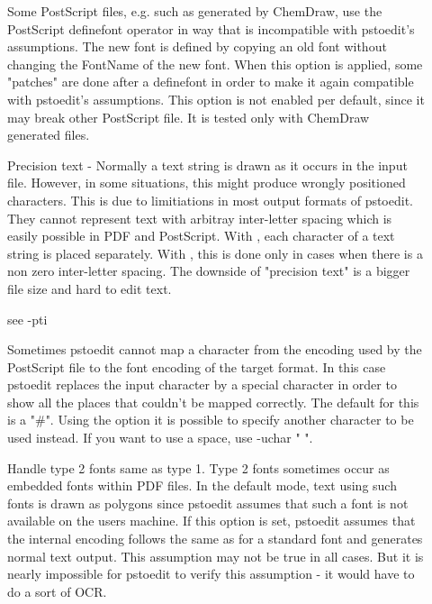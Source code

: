 \documentclass[english,a4paper]{article}
\begin{document}
\begin{description}
\item[] 
Some PostScript files, e.g. such as generated by ChemDraw, use the PostScript definefont operator in way that is incompatible with pstoedit's assumptions. The new font is defined by copying an old font without changing the FontName of the new font. When this option is applied, some "patches" are done after a definefont in order to make it again compatible with pstoedit's assumptions. This option is not enabled per default, since it may break other PostScript file. It is tested only with ChemDraw generated files.


\item[] 
Precision text - Normally a text string is drawn as it occurs in the input file. However, in some situations, this might produce wrongly positioned characters. This is due to limitiations in most output formats of pstoedit. They cannot represent text with arbitray inter-letter spacing which is easily possible in PDF and PostScript. With , each character of a text string is placed separately. With , this is done only in cases when there is a non zero inter-letter spacing. The downside of "precision text" is a bigger file size and hard to edit text.


\item[] 
see -pti


\item[] 
Sometimes pstoedit cannot map a character from the encoding used by the PostScript file to the font encoding of the target format. In this case pstoedit replaces the input character by a special character in order to show all the places that couldn't be mapped correctly. The default for this is a "\#". Using the  option it is possible to specify another character to be used instead. If you want to use a space, use -uchar " ".


\item[] 
Handle type 2 fonts same as type 1. Type 2 fonts sometimes occur as embedded fonts within PDF files. In the default mode, text using such fonts is drawn as polygons since pstoedit assumes that such a font is not available on the users machine. If this option is set, pstoedit assumes that the internal encoding follows the same as for a standard font and generates normal text output. This assumption may not be true in all cases. But it is nearly impossible for pstoedit to verify this assumption - it would have to do a sort of OCR.



\end{description}
\end{document}
